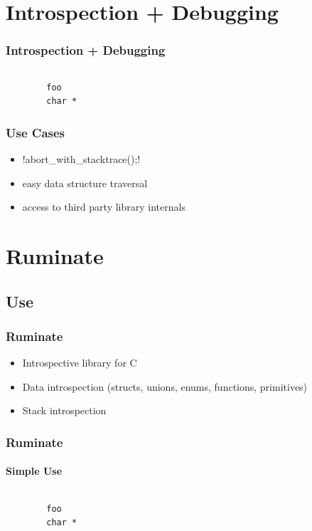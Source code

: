 \documentclass{beamer}
\begin{document}
\section{Introspection + Debugging}

\begin{frame}[fragile]
	\frametitle{Introspection + Debugging}

	\inputminted[tabsize=4,linenos]{c}{struct_introspect.c}
	\pause
	\begin{verbatim}
		foo
		char *
	\end{verbatim}
\end{frame}

\begin{frame}[fragile]
	\frametitle{Use Cases}

	\begin{itemize}[<structure@+>]
		\item {}!abort_with_stacktrace();!
		\item easy data structure traversal
		\item access to third party library internals
	\end{itemize}
\end{frame}

\section{Ruminate}
\subsection{Use}

\begin{frame}
	\frametitle{Ruminate}

	\begin{itemize}[<structure@+>]
		\item Introspective library for C
		\item Data introspection (structs, unions, enums, functions, primitives)
		\item Stack introspection
	\end{itemize}
\end{frame}

\begin{frame}
	\frametitle{Ruminate}
	\framesubtitle{Simple Use}

	\inputminted[tabsize=4,linenos]{c}{ruminate_simple.c}
	\pause
	\begin{verbatim}
		foo
		char *
	\end{verbatim}
\end{frame}
\end{document}
